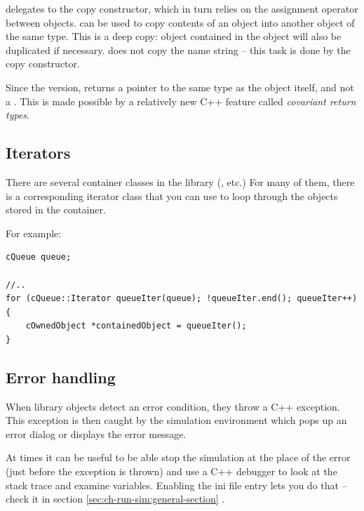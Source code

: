  delegates to the copy constructor, which in
turn relies on the assignment operator between objects.
 can be used to copy contents of an object into
another object of the same type. This is a deep copy: object
contained in the object will also be duplicated if necessary.
 does not copy the name string -- this task is done
by the copy constructor.

\begin{note}
    Since the  version,  returns a pointer to
    the same type as the object itself, and not a .
    This is made possible by a relatively new C++ feature called
    \textit{covariant return types}.
\end{note}

\subsection{Iterators}


There are several container classes in the library (,
 etc.) For many of them, there is a corresponding
iterator class that you can use to loop through the objects stored in
the container.

For example:

\begin{verbatim}
cQueue queue;

//..
for (cQueue::Iterator queueIter(queue); !queueIter.end(); queueIter++)
{
    cOwnedObject *containedObject = queueIter();
}
\end{verbatim}



\subsection{Error handling}


When library objects detect an error condition, they throw a C++ exception.
This exception is then caught by the simulation environment which pops up
an error dialog or displays the error message.

At times it can be useful to be able stop the simulation at the place of the error
(just before the exception is thrown) and use a C++ debugger to look
at the stack trace and examine variables. Enabling the 
ini file entry lets you do that -- check it in section
\ref{sec:ch-run-sim:general-section}  .

